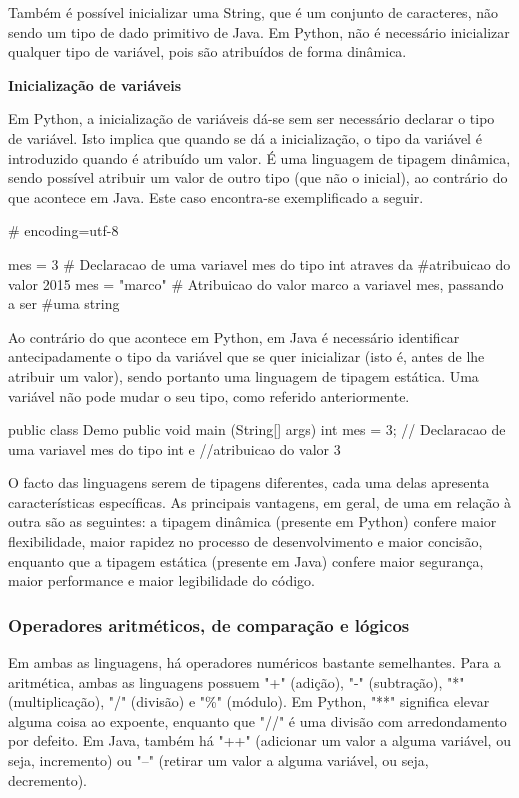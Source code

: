 \documentclass[11pt,openright,twoside]{report}
\begin{document}
Também é possível inicializar uma String, que é um conjunto de caracteres, não sendo um tipo de dado primitivo de Java.
Em Python, não é necessário inicializar qualquer tipo de variável, pois são atribuídos de forma dinâmica.
\medskip

\textbf{Inicialização de variáveis}
\smallskip

Em Python, a inicialização de variáveis dá-se sem ser necessário declarar o tipo de variável. Isto implica que quando se dá a inicialização, o tipo da variável é introduzido quando é atribuído um valor. É uma linguagem de tipagem dinâmica, sendo possível atribuir um valor de outro tipo (que não o inicial), ao contrário do que acontece em Java. Este caso encontra-se exemplificado a seguir.

\smallskip
\begin{Python}
# encoding=utf-8

mes = 3 # Declaracao de uma variavel mes do tipo int atraves da #atribuicao do valor 2015
mes = "marco" # Atribuicao do valor marco a variavel mes, passando a ser #uma string
\end{Python}
\smallskip

Ao contrário do que acontece em Python, em Java é necessário identificar antecipadamente o tipo da variável que se quer inicializar (isto é, antes de lhe atribuir um valor), sendo portanto uma linguagem de tipagem estática. Uma variável não pode mudar o seu tipo, como referido anteriormente.

\smallskip
\begin{Java}
public class Demo{
	public void main (String[] args){
		int mes = 3; // Declaracao de uma variavel mes do tipo int e //atribuicao do valor 3
	}
}
\end{Java}
\smallskip

O facto das linguagens serem de tipagens diferentes, cada uma delas apresenta características específicas. As principais vantagens, em geral, de uma em relação à outra são as seguintes: a tipagem dinâmica (presente em Python) confere maior flexibilidade, maior rapidez no processo de desenvolvimento e maior concisão, enquanto que a tipagem estática (presente em Java) confere maior segurança, maior performance e maior legibilidade do código.
\medskip

\subsubsection{Operadores aritméticos, de comparação e lógicos}
Em ambas as linguagens, há operadores numéricos bastante semelhantes. Para a aritmética, ambas as linguagens possuem "+" (adição), "-" (subtração), "*" (multiplicação), "/" (divisão) e "\%" (módulo). Em Python, "**" significa elevar alguma coisa ao expoente, enquanto que "//" é uma divisão com arredondamento por defeito. Em Java, também há "++" (adicionar um valor a alguma variável, ou seja, incremento) ou "\---" (retirar um valor a alguma variável, ou seja, decremento).
\smallskip
\end{document}
